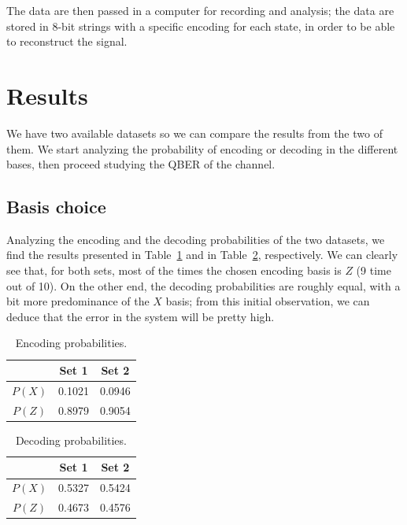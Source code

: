 \documentclass[prl,twocolumn]{revtex4-1}
\begin{document}
The data are then passed in a computer for recording and analysis; the data are stored in 8-bit strings with a specific encoding for each state, in order to be able to reconstruct the signal.

\section{Results}
We have two available datasets so we can compare the results from the two of them. We start analyzing the probability of encoding or decoding in the different bases, then proceed studying the QBER of the channel.

\subsection{Basis choice}
Analyzing the encoding and the decoding probabilities of the two datasets, we find the results presented in Table~\ref{tab:encoding} and in Table~\ref{tab:decoding}, respectively. We can clearly see that, for both sets, most of the times the chosen encoding basis is $Z$ (9 time out of 10). On the other end, the decoding probabilities are roughly equal, with a bit more predominance of the $X$ basis; from this initial observation, we can deduce that the error in the system will be pretty high.

\begin{table}[!h]
    \centering
    \begin{tabular}{c|c|c}
         & Set 1 &  Set 2\\
         \hline
         \hline
        $P(X)$ &  0.1021 & 0.0946\\
        \hline
        $P(Z)$ &  0.8979 & 0.9054\\
    \end{tabular}
    \caption{Encoding probabilities.}
    \label{tab:encoding}
\end{table}


\begin{table}[!h]
    \centering
    \begin{tabular}{c|c|c}
         & Set 1 & Set 2\\
         \hline
         \hline
        $P(X)$ & 0.5327 & 0.5424\\
        \hline
        $P(Z)$ & 0.4673 & 0.4576\\
    \end{tabular}
    \caption{Decoding probabilities.}
    \label{tab:decoding}
\end{table}
\end{document}
